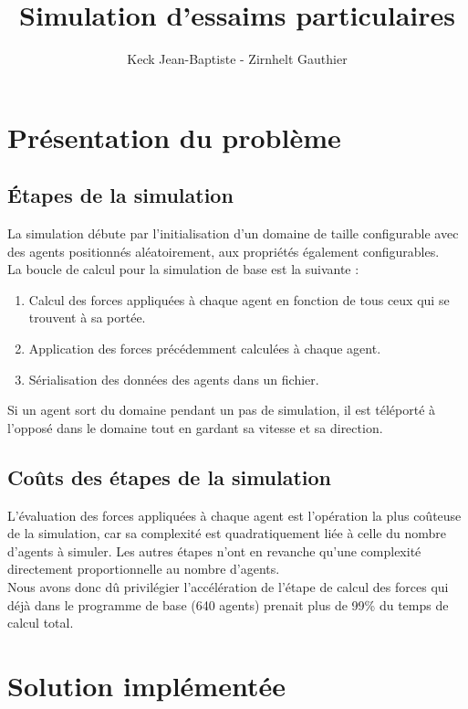 \documentclass[12pt,a4paper,sans]{article}
\title{Simulation d'essaims particulaires}
\author{Keck Jean-Baptiste - Zirnhelt Gauthier}
\begin{document}
\maketitle



\section{Présentation du problème}

\subsection{Étapes de la simulation}
La simulation débute par l'initialisation d'un domaine de taille configurable avec des agents positionnés aléatoirement, aux propriétés également configurables.\\
La boucle de calcul pour la simulation de base est la suivante :
\begin{enumerate}
    \item Calcul des forces appliquées à chaque agent en fonction de tous ceux qui se trouvent à sa portée.
    \item Application des forces précédemment calculées à chaque agent.
    \item Sérialisation des données des agents dans un fichier.
\end{enumerate}
Si un agent sort du domaine pendant un pas de simulation, il est téléporté à l'opposé dans le domaine tout en gardant sa vitesse et sa direction.

\subsection{Coûts des étapes de la simulation}
L'évaluation des forces appliquées à chaque agent est l'opération la plus coûteuse de la simulation, car sa complexité est quadratiquement liée à celle du nombre d'agents à simuler. Les autres étapes n'ont en revanche qu'une complexité directement proportionnelle au nombre d'agents.\\
Nous avons donc dû privilégier l'accélération de l'étape de calcul des forces qui déjà dans le programme de base (640 agents) prenait plus de 99\% du temps de calcul total.



\newpage
\section{Solution implémentée}
\end{document}
